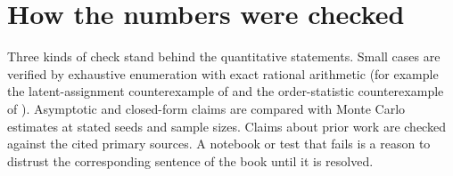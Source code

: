 \section*{How the numbers were checked}

Three kinds of check stand behind the quantitative statements. Small cases are
verified by exhaustive enumeration with exact rational arithmetic (for example
the latent-assignment counterexample of  and
the order-statistic counterexample of ).
Asymptotic and closed-form claims are compared with Monte Carlo estimates at
stated seeds and sample sizes. Claims about prior work are checked against the
cited primary sources. A notebook or test that fails is a reason to distrust the
corresponding sentence of the book until it is resolved.
